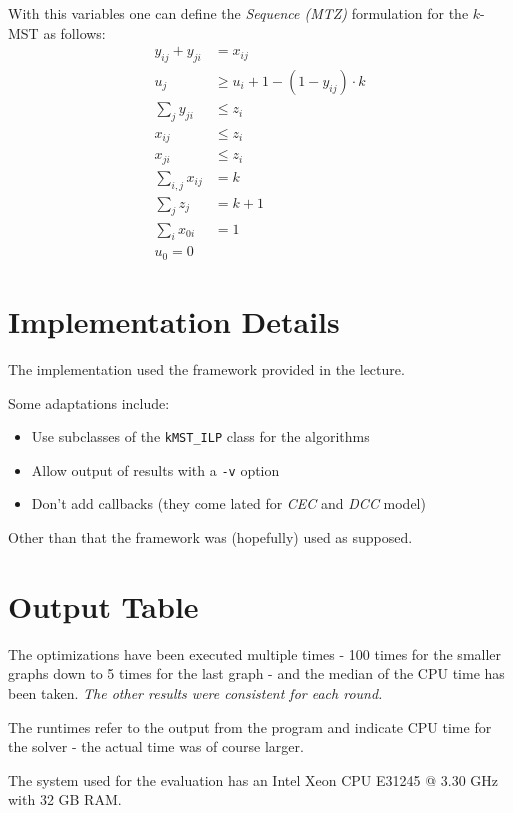 \documentclass[11pt, oneside, a4paper, fleqn]{article}
\begin{document}
With this variables one can define the \emph{Sequence (MTZ)}
formulation for the $k$-MST as follows:
\begin{align}
  y_{ij}+y_{ji} & = x_{ij} \\
  u_j & \ge u_i + 1 - (1 - y_{ij})\cdot k \\
  \sum_{j} y_{ji} & \le z_i \\
  x_{ij} & \le z_i \\
  x_{ji} & \le z_i \\
  \sum_{i,j} x_{ij} & = k \\
  \sum_{j} z_j & = k + 1 \\
  \sum_{i} x_{0i} & = 1 \\
  u_0 = 0
\end{align}

\section*{Implementation Details}

The implementation used the framework provided in the lecture.

Some adaptations include:
\begin{itemize}
\item Use subclasses of the \texttt{kMST\_ILP} class
      for the algorithms
\item Allow output of results with a \texttt{-v} option
\item Don't add callbacks (they come lated for \emph{CEC} and \emph{DCC} model)
\end{itemize}

Other than that the framework was (hopefully) used as supposed.

\section*{Output Table}

The optimizations have been executed multiple times -
100 times for the smaller graphs down to 5 times for the last graph -
and the median of the CPU time has been taken.
\emph{The other results were consistent for each round.}

The runtimes refer to the output from the program and indicate
CPU time for the solver - the actual time was of course larger.

The system used for the evaluation has an Intel\textregistered{}
Xeon\textregistered{} CPU E31245 @ 3.30 GHz with 32 GB RAM.
\end{document}
